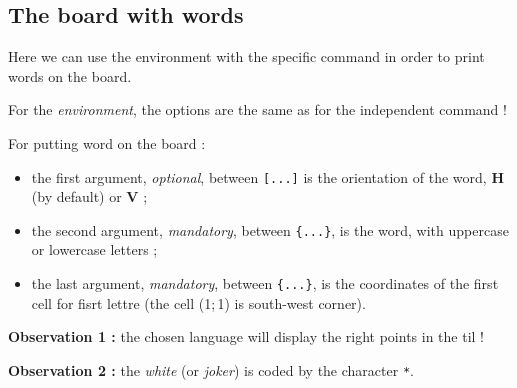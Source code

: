 \documentclass{article}
\newcommand\Cle[1]{{\bfseries\sffamily\textlangle #1\textrangle}}
\begin{document}
\newpage

\subsection{The board with words}

Here we can use the \textsf{environment} with the specific \textsf{command} in order to print words on the board.

\smallskip

For the \textit{environment}, the options are the same as for the independent \textsf{command} !

\smallskip

For putting word on the board :

\begin{itemize}
	\item the first argument, \textit{optional}, between \texttt{[...]} is the orientation of the word, \Cle{H} (by default) or \Cle{V} ;
	\item the second argument, \textit{mandatory}, between \texttt{\{...\}}, is the word, with uppercase or lowercase letters ;
	\item the last argument, \textit{mandatory}, between \texttt{\{...\}}, is the coordinates of the first cell for fisrt lettre (the cell (1;\,1) is south-west corner).
\end{itemize}

\textbf{Observation 1 :} the chosen language will display the right points in the til !

\smallskip

\textbf{Observation 2 :} the \textit{white} (or \textit{joker}) is coded by the character \texttt{*}.

\begin{PresentationCode}{}
\begin{EnvScrabble}[Scale=0.75,Labels=false,Help]
\end{EnvScrabble}
\end{PresentationCode}
\end{document}
